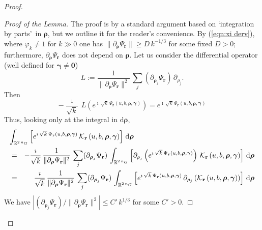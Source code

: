 \documentclass[10pt,a4paper]{amsart}
\begin{document}
\begin{proof}
\begin{proof}[Proof of the Lemma]
The proof is by a standard argument based on 
\lq integration by parts\rq\, 
in $\boldsymbol{\rho}$, but we outline it 
for the reader's convenience.
By (\ref{eqn:xi derv}), where $\varphi_k\neq 1$ 
for $k\gg 0$ one has
$\|\partial_{\boldsymbol{\rho}}
\Psi_{\mathbf{r}}\|\ge D\,k^{-1/3}$ for some fixed $D>0$;
furthermore, $\partial_{\boldsymbol{\rho}}
\Psi_{\mathbf{r}}$ does not depend on $\boldsymbol{\rho}$.
Let us consider the differential operator (well defined for
$\boldsymbol{\gamma}\neq \mathbf{0}$)
$$
L:=\frac{1}{\|\partial_{\boldsymbol{\rho}}
\Psi_{\mathbf{r}}\|^2}\,
\sum_j (\partial_{\boldsymbol{\rho}_j}
\Psi_{\mathbf{r}})\,\partial_{\rho_j}.
$$
Then
%
$$
-\frac{\imath}{\sqrt{k}}\,
L\left(e^{\imath\,\sqrt{k}\,
\Psi_{\mathbf{r}}
\left(u,b,\boldsymbol{\rho},
\boldsymbol{\gamma} \right)}\right)=
 e^{\imath\,\sqrt{k}\,
\Psi_{\mathbf{r}}
\left(u,b,\boldsymbol{\rho},
\boldsymbol{\gamma} \right)}
$$
Thus, looking only at the integral in $\mathrm{d}\boldsymbol{\rho}$,
\begin{eqnarray}
\label{eqn:int by part rho}
\lefteqn{\int_{\mathbb{R}^{2\,n_G}}
%
\left[
 e^{\imath\,\sqrt{k}\,
\Psi_{\mathbf{r}}
\left(u,b,\boldsymbol{\rho},
\boldsymbol{\gamma} \right)}\,
\mathcal{K}_{\mathbf{r}}\left(u,b,\boldsymbol{\rho},
\boldsymbol{\gamma} \right)\right]\,\mathrm{d}
\boldsymbol{\rho}  }\\
&=&-\frac{\imath}{\sqrt{k}}\,
\frac{1}{\|\partial_{\boldsymbol{\rho}}
\Psi_{\mathbf{r}}\|^2}\,
\sum_j (\partial_{\boldsymbol{\rho}_j}
\Psi_{\mathbf{r}})\,
\int_{\mathbb{R}^{2\,n_G}}
%
\left[\partial_{\rho_j}\left(
 e^{\imath\,\sqrt{k}\,
\Psi_{\mathbf{r}}
\left(u,b,\boldsymbol{\rho},
\boldsymbol{\gamma} \right)}\right)\,
\mathcal{K}_{\mathbf{r}}\left(u,b,\boldsymbol{\rho},
\boldsymbol{\gamma} \right)\right]\,\mathrm{d}
\boldsymbol{\rho}\nonumber\\
&=&\frac{\imath}{\sqrt{k}}\,
\frac{1}{\|\partial_{\boldsymbol{\rho}}
\Psi_{\mathbf{r}}\|^2}\,
\sum_j (\partial_{\boldsymbol{\rho}_j}
\Psi_{\mathbf{r}})\,
\int_{\mathbb{R}^{2\,n_G}}
%
\left[
 e^{\imath\,\sqrt{k}\,
\Psi_{\mathbf{r}}
\left(u,b,\boldsymbol{\rho},
\boldsymbol{\gamma} \right)}\,
\partial_{\rho_j}\left(\mathcal{K}_{\mathbf{r}}\left(u,b,\boldsymbol{\rho},
\boldsymbol{\gamma} \right)\right)\right]\,\mathrm{d}
\boldsymbol{\rho}\nonumber
\end{eqnarray}
We have $\left|(\partial_{\boldsymbol{\rho}_j}
\Psi_{\mathbf{r}})/\|\partial_{\boldsymbol{\rho}}
\Psi_{\mathbf{r}}\|^2\right|\le C'\,k^{1/3}$ for some
$C'>0$.


\end{proof}
\end{proof}
\end{document}
